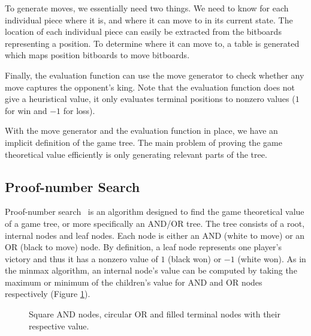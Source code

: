 \documentclass{article}
\begin{document}
To generate moves, we essentially need two things. We need to know for each individual piece where it is, and where it can move to in its current state.
The location of each individual piece can easily be extracted from the bitboards representing a position. To determine where it can move to, a table
is generated which maps position bitboards to move bitboards. %

Finally, the evaluation function can use the move generator to check whether any move captures the opponent's king. Note that the evaluation function
does not give a heuristical value, it only evaluates terminal positions to nonzero values ($1$ for win and $-1$ for loss).

With the move generator and the evaluation function in place, we have an implicit definition of the game tree. The main problem of proving the game
theoretical value efficiently is only generating relevant parts of the tree.

\subsection{Proof-number Search}
Proof-number search~\cite{allis1994proof} is an algorithm designed to find the game theoretical value of a game tree, or more specifically an AND/OR tree.
The tree consists of a root, internal nodes and leaf nodes. Each node is either an AND (white to move) or an OR (black to move) node. By definition, a leaf
node represents one player's victory and thus it has a nonzero value of $1$ (black won) or $-1$ (white won). As in the minmax algorithm, an internal
node's value can be computed by taking the maximum or minimum of the children's value for AND and OR nodes respectively (Figure \ref{tree:simple}).

\begin{figure}[h]
\center
{}
\caption{Square AND nodes, circular OR and filled terminal nodes with their respective value.}
\label{tree:simple}
\end{figure}
\end{document}
